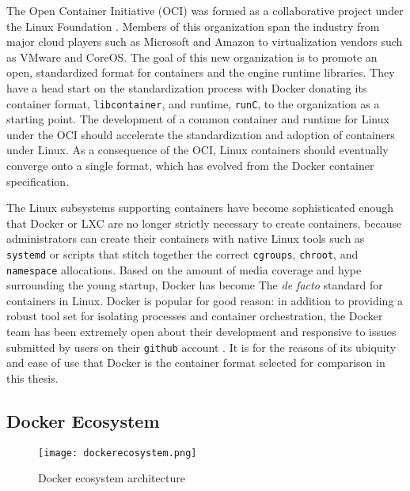 The Open Container Initiative (OCI) was formed as a collaborative project under the Linux Foundation \autocite{_oci_1}.
Members of this organization span the industry from major cloud players such as Microsoft and Amazon to virtualization vendors such as VMware and CoreOS.  
The goal of this new organization is to promote an open, standardized format for containers and the engine runtime libraries. 
They have a head start on the standardization process with Docker donating its container format, \texttt{libcontainer}, and runtime, \texttt{runC}, to the organization as a starting point.
The development of a common container and runtime for Linux under the OCI should accelerate the standardization and adoption of containers under Linux.
As a consequence of the OCI, Linux containers should eventually converge onto a single format, which has evolved from the Docker container specification.   

The Linux subsystems supporting containers have become sophisticated enough that Docker or LXC are no longer strictly necessary to create containers, because administrators can create their containers with native Linux  tools such as \texttt{systemd} or scripts that stitch together the correct \texttt{cgroups}, \texttt{chroot}, and \texttt{namespace} allocations. 
Based on the amount of media coverage and hype surrounding the young startup, Docker has become The \emph{de facto} standard for containers in Linux.  
Docker is popular for good reason: in addition to providing a robust tool set for isolating processes and container orchestration, the Docker team has been extremely open about their development and responsive to issues submitted by users on their \texttt{github} account \autocite{githubdocker}.  
It is for the reasons of its ubiquity and ease of use that Docker is the container format selected for comparison in this thesis.

\subsection{Docker Ecosystem} %
\label{sec:dockerecosystem}
\begin{figure}
    \centering
    \texttt{[image: dockerecosystem.png]}
    \caption{Docker ecosystem architecture \autocite{dockerarch1}}
    \label{fig:dockerecosystem}
\end{figure}

